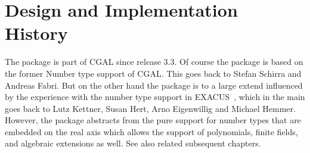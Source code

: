 \section{Design and Implementation History}

The package is part of CGAL since release 3.3. Of course the package is based 
on the former Number type support of CGAL. This goes back to Stefan Schirra and Andreas Fabri. But on the other hand the package is to a large extend influenced 
by the experience with the number type support in EXACUS~\cite{beh+-eeeafcs-05}, 
which in the main goes back to 
Lutz Kettner, Susan Hert, Arno Eigenwillig and Michael Hemmer. 
However, the package abstracts from the pure support for 
number types that are embedded on the real axis which allows the support of 
polynomials, finite fields, and algebraic extensions as well. See also related 
subsequent chapters. 

